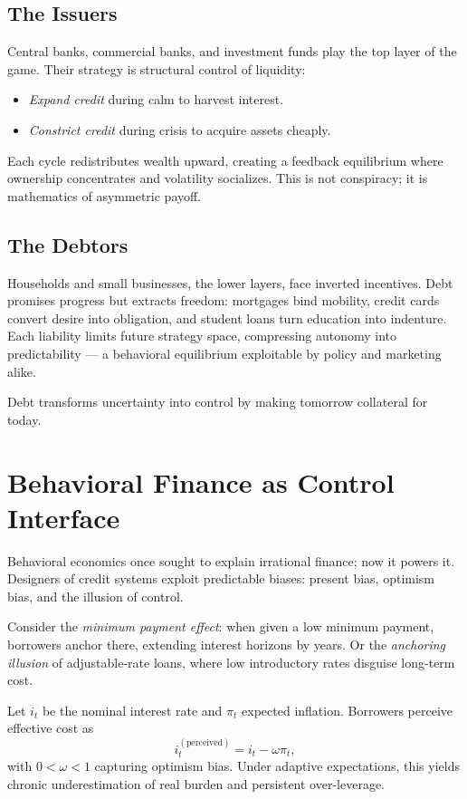 \documentclass[12pt,twoside]{book}
\begin{document}
\subsection*{The Issuers}
Central banks, commercial banks, and investment funds play the top layer of the game.  
Their strategy is structural control of liquidity:  
\begin{itemize}
  \item \emph{Expand credit} during calm to harvest interest.  
  \item \emph{Constrict credit} during crisis to acquire assets cheaply.  
\end{itemize}
Each cycle redistributes wealth upward, creating a feedback equilibrium where ownership concentrates and volatility socializes.  
This is not conspiracy; it is mathematics of asymmetric payoff.

\subsection*{The Debtors}
Households and small businesses, the lower layers, face inverted incentives.  
Debt promises progress but extracts freedom: mortgages bind mobility, credit cards convert desire into obligation, and student loans turn education into indenture.  
Each liability limits future strategy space, compressing autonomy into predictability --- a behavioral equilibrium exploitable by policy and marketing alike. \\

\begin{keyidea}
Debt transforms uncertainty into control by making tomorrow collateral for today.
\end{keyidea}

\section{Behavioral Finance as Control Interface}

Behavioral economics once sought to explain irrational finance; now it powers it.  
Designers of credit systems exploit predictable biases: present bias, optimism bias, and the illusion of control.  

Consider the \emph{minimum payment effect}:  
when given a low minimum payment, borrowers anchor there, extending interest horizons by years.  
Or the \emph{anchoring illusion} of adjustable-rate loans, where low introductory rates disguise long-term cost.

\begin{tcolorbox}[colback=gray!5,colframe=gray!60,boxrule=0.4pt,arc=1mm,
title={Mathematical Interlude: Behavioral Interest Anchoring}]
Let $i_t$ be the nominal interest rate and $\pi_t$ expected inflation.  
Borrowers perceive effective cost as
\[
i_t^{(\text{perceived})} = i_t - \omega \pi_t,
\]
with $0 < \omega < 1$ capturing optimism bias.  
Under adaptive expectations, this yields chronic underestimation of real burden and persistent over-leverage.
\end{tcolorbox}
\end{document}
